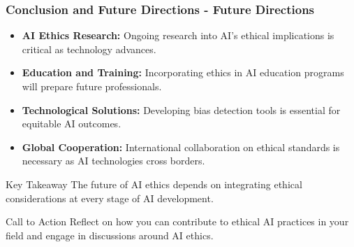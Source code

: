 \documentclass{beamer}
\begin{document}
\begin{frame}[fragile]
    \frametitle{Conclusion and Future Directions - Future Directions}
    \begin{itemize}
        \item \textbf{AI Ethics Research:} Ongoing research into AI's ethical implications is critical as technology advances.
        
        \item \textbf{Education and Training:} Incorporating ethics in AI education programs will prepare future professionals.
        
        \item \textbf{Technological Solutions:} Developing bias detection tools is essential for equitable AI outcomes.
        
        \item \textbf{Global Cooperation:} International collaboration on ethical standards is necessary as AI technologies cross borders.
    \end{itemize}

    \begin{block}{Key Takeaway}
        The future of AI ethics depends on integrating ethical considerations at every stage of AI development.
    \end{block}

    \begin{block}{Call to Action}
        Reflect on how you can contribute to ethical AI practices in your field and engage in discussions around AI ethics.
    \end{block}
\end{frame}
\end{document}
